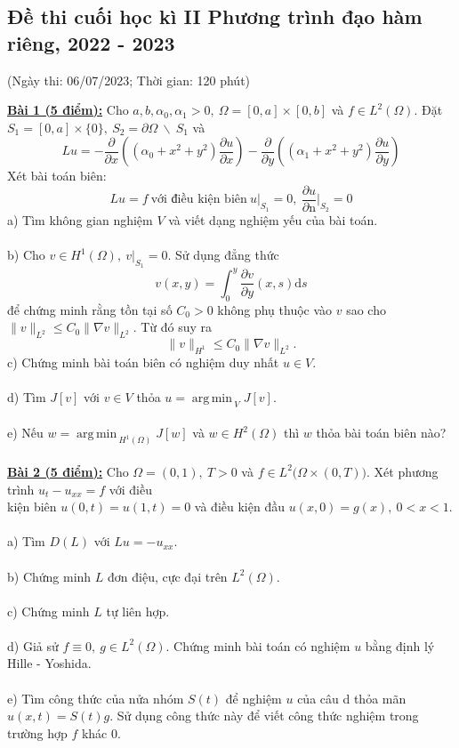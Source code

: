 \documentclass[10.5pt, a4paper]{article}
\DeclareMathOperator*{\argmin}{arg\,min\,}
\begin{document}
\subsection{Đề thi cuối học kì II Phương trình đạo hàm riêng, 2022 - 2023}
\begin{center}
	\color{blue}(Ngày thi: 06/07/2023; Thời gian: 120 phút)
\end{center}
\color{red}\underline{\textbf{Bài 1 (5 điểm):}} \color{black}Cho $a,b,\alpha_0,\alpha_1>0,~\Omega=[0,a]\times[0,b]$ và $f\in L^2(\Omega)$. Đặt $S_1=[0,a]\times\{0\},~S_2=\partial\Omega~\backslash~S_1$ và $$Lu=-\dfrac{\partial}{\partial x}\left((\alpha_0+x^2+y^2)\dfrac{\partial u}{\partial x}\right)-\dfrac{\partial}{\partial y}\left((\alpha_1+x^2+y^2)\dfrac{\partial u}{\partial y}\right)$$
Xét bài toán biên: $$Lu=f~\text{với điều kiện biên}~u\big|_{S_1}=0,~\dfrac{\partial u}{\partial\text{n}}\bigg|_{S_2}=0$$
\color{red}a) \color{black}Tìm không gian nghiệm $V$ và viết dạng nghiệm yếu của bài toán.\\\\
\color{red}b) \color{black}Cho $v\in H^1(\Omega),~v\big|_{S_1}=0$. Sử dụng đẳng thức $$v(x,y)=\displaystyle\int_0^y\dfrac{\partial v}{\partial y}(x,s)\text{d}s$$ để chứng minh rằng tồn tại số $C_0>0$ không phụ thuộc vào $v$ sao cho $\lVert v\rVert_{L^2}\le C_0\lVert\nabla v\rVert_{L^2}$. Từ đó suy ra $$\lVert v\rVert_{H^1}\le C_0\lVert\nabla v\rVert_{L^2}.$$
\color{red}c) \color{black}Chứng minh bài toán biên có nghiệm duy nhất $u\in V$.\\\\
\color{red}d) \color{black}Tìm $J[v]$ với $v\in V$ thỏa $u=\displaystyle\argmin_VJ[v]$.\\\\
\color{red}e) \color{black}Nếu $w=\displaystyle\argmin_{H^1(\Omega)}J[w]$ và $w\in H^2(\Omega)$ thì $w$ thỏa bài toán biên nào?\\\\
\color{red}\underline{\textbf{Bài 2 (5 điểm):}} \color{black}Cho $\Omega=(0,1),~T>0$ và $f\in L^2\big(\Omega\times(0,T)\big)$. Xét phương trình $u_t-u_{xx}=f$ với điều\\ kiện biên $u(0,t)=u(1,t)=0$ và điều kiện đầu $u(x,0)=g(x),~0<x<1$.\\\\
\color{red}a) \color{black}Tìm $D(L)$ với $Lu=-u_{xx}$.\\\\
\color{red}b) \color{black}Chứng minh $L$ đơn điệu, cực đại trên $L^2(\Omega)$.\\\\
\color{red}c) \color{black}Chứng minh $L$ tự liên hợp.\\\\
\color{red}d) \color{black}Giả sử $f\equiv0,~g\in L^2(\Omega)$. Chứng minh bài toán có nghiệm $u$ bằng định lý Hille - Yoshida.\\\\
\color{red}e) \color{black}Tìm công thức của nửa nhóm $S(t)$ để nghiệm $u$ của câu d thỏa mãn $u(x,t)=S(t)g$. Sử dụng công thức này để viết công thức nghiệm trong trường hợp $f$ khác 0.
\end{document}
